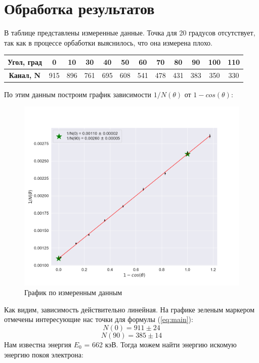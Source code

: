 \documentclass[a4paper, 12pt]{article}
\begin{document}
\section{Обработка результатов}
В таблице представлены измеренные данные. Точка для 20 градусов отсутствует, так как в процессе орбаботки выяснилось, что она измерена плохо.

\begin{table}[H]
	\centering
	\begin{tabular}{|c|c|c|c|c|c|c|c|c|c|c|c|}
	\hline
	\textbf{Угол, град} & 0   & 10  & 30  & 40  & 50  & 60  & 70  & 80  & 90  & 100 & 110 \\ \hline
	\textbf{Канал, N}   & 915 & 896 & 761 & 695 & 608 & 541 & 478 & 431 & 383 & 350 & 330 \\ \hline
	\end{tabular}
	\end{table}

По этим данным построим график зависимости $ 1 / N(\theta)$ от $1 - cos(\theta)$:
\begin{figure}[H]
    \centering
    \includegraphics[width=1\textwidth]{plot.png}
    \caption{График по измеренным данным}
\end{figure}
Как видим, зависимость действительно линейная. На графике зеленым маркером отмечены интересующие нас точки для формулы (\ref{eq:main}):
\begin{equation*}
	N(0) = 911 \pm 24
\end{equation*}
\begin{equation*}
	N(90) = 385 \pm 14
\end{equation*}
Нам известна энергия $E_0$ = 662 кэВ. Тогда можем найти энергию искомую энергию покоя электрона:
\end{document}
